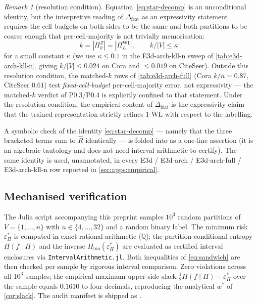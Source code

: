 \documentclass[10pt]{article}
\theoremstyle{definition}
\theoremstyle{remark}
\newtheorem{remark}[theorem]{Remark}
\newcommand{\Hbin}{H_{\mathrm{bin}}}
\newcommand{\eps}{\varepsilon}
\newcommand{\epsP}{\eps^{\!*}_{\Pi}}
\begin{document}
\begin{remark}[resolution condition]\label{rem:resolution}
Equation~\eqref{eq:star-decomp} is an unconditional identity,
but the interpretive reading of $\Delta_{\mathrm{feat}}$ as an
expressivity statement requires the cell budgets on both sides
to be the same and both partitions to be coarse enough that
per-cell-majority is not trivially memorisation:
\[
  k = |\Pi^{Z}_{k}| = |\Pi^{\mathrm{WL}}_{L}|,
  \qquad
  k / |V| \le \kappa
\]
for a small constant $\kappa$ (we use $\kappa \le 0.1$ in the
E3d-arch-kll-n sweep of \cref{tab:e3d-arch-kll-n}, giving
$k/|V| \le 0.024$ on Cora and $\le 0.019$ on CiteSeer). Outside
this resolution condition, the matched-$k$ rows of
\cref{tab:e3d-arch-full} (Cora $k/n = 0.87$, CiteSeer $0.61$)
test \emph{fixed-cell-budget} per-cell-majority error, not
expressivity --- the matched-$k$ verdict of P0.3/P0.4 is
explicitly confined to that statement. Under the resolution
condition, the empirical content of $\Delta_{\mathrm{feat}}$
is the expressivity claim that the trained representation
strictly refines $1$-WL with respect to the labelling.
\end{remark}

A symbolic check of the identity \eqref{eq:star-decomp} ---
namely that the three bracketed terms sum to $\hat R$
identically --- is folded into  as a one-line
assertion (it is an algebraic tautology and does not need
interval arithmetic to certify). The same identity is used,
unannotated, in every E3d / E3d-arch / E3d-arch-full /
E3d-arch-kll-n row reported in \cref{sec:apps:empirical}.

\subsection{Mechanised verification}\label{sec:apps:verify}

The Julia script  accompanying this preprint
samples $10^{3}$ random partitions of $V = \{1, \ldots, n\}$
with $n \in \{4, \ldots, 32\}$ and a random binary label. The
minimum risk $\epsP$ is computed in exact rational arithmetic
($\mathbb{Q}$); the partition-conditional entropy $H(f \mid \Pi)$
and the inverse $\Hbin(\epsP)$ are evaluated as certified interval
enclosures via \texttt{IntervalArithmetic.jl}. Both inequalities
of \eqref{eq:sandwich} are then checked per sample by rigorous
interval comparison. Zero violations across all $10^{3}$ samples;
the empirical maximum upper-side slack
$\tfrac{1}{2}H(f\mid\Pi) - \epsP$ over the sample equals
$0.1610$ to four decimals, reproducing the analytical $w^{*}$
of \cref{cor:slack}. The audit manifest is shipped as
.
\end{document}
